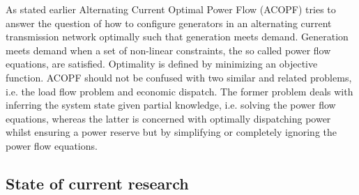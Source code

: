 \documentclass[11pt]{cmuthesis} %
\begin{document}
As stated earlier Alternating Current Optimal Power Flow (ACOPF) tries to answer the question of how to configure generators in an alternating current transmission network optimally such that generation meets demand. Generation meets demand when a set of non-linear constraints, the so called power flow equations, are satisfied. Optimality is defined by minimizing an objective function. ACOPF should not be confused with two similar and related problems, i.e. the load flow problem and economic dispatch. The former problem deals with inferring the system state given partial knowledge, i.e. solving the power flow equations, whereas the latter is concerned with optimally dispatching power whilst ensuring a power reserve but by simplifying or completely ignoring the power flow equations.

\subsection{State of current research}
\end{document}
